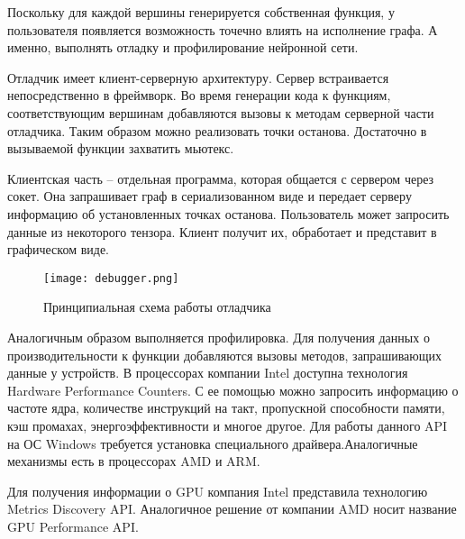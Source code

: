 Поскольку для каждой вершины генерируется собственная функция, у пользователя
появляется возможность точечно влиять на исполнение графа. А именно, выполнять
отладку и профилирование нейронной сети.

Отладчик имеет клиент-серверную архитектуру. Сервер встраивается непосредственно
в фреймворк. Во время генерации кода к функциям, соответствующим вершинам
добавляются вызовы к методам серверной части отладчика. Таким образом можно реализовать
точки останова. Достаточно в вызываемой функции захватить мьютекс.

Клиентская часть -- отдельная программа, которая общается с сервером через сокет.
Она запрашивает граф в сериализованном виде и передает серверу информацию об
установленных точках останова. Пользователь может запросить данные из некоторого
тензора. Клиент получит их, обработает и представит в графическом виде.

\begin{figure}[ht]
    \centering
    \texttt{[image: debugger.png]}
    \caption{Принципиальная схема работы отладчика}
    \label{fig:debugger}
\end{figure}

Аналогичным образом выполняется профилировка. Для получения данных о производительности
к функции добавляются вызовы методов, запрашивающих данные у устройств.
В процессорах компании Intel доступна технология Hardware Performance Counters.
С ее помощью можно запросить информацию о частоте ядра, количестве инструкций
на такт, пропускной способности памяти, кэш промахах, энергоэффективности
и многое другое. Для работы данного API на ОС Windows требуется
установка специального драйвера.Аналогичные механизмы есть в процессорах AMD
и ARM.

Для получения информации о GPU компания Intel представила технологию Metrics
Discovery API. Аналогичное решение от компании AMD носит название GPU Performance
API.
